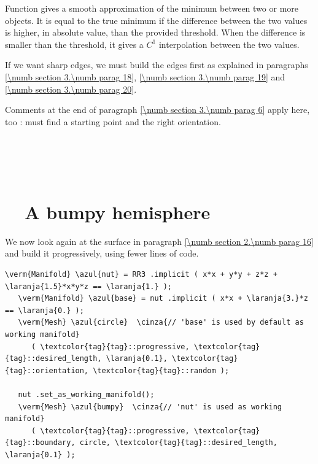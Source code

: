Function {\small\tt{}} gives a smooth approximation of the minimum between
two or more {\small\tt{}} objects.
It is equal to the true minimum if the difference between the two values is higher, in
absolute value, than the provided threshold.
When the difference is smaller than the threshold, it gives a $ C^1 $ interpolation between
the two values.

If we want sharp edges, we must build the edges first as explained in paragraphs
\ref{\numb section 3.\numb parag 18}, \ref{\numb section 3.\numb parag 19} and
\ref{\numb section 3.\numb parag 20}.

Comments at the end of paragraph \ref{\numb section 3.\numb parag 6} apply here, too :
{\maniFEM} must find a starting point and the right orientation.


\section{~~\cinza{[empty]}}\label{\numb section 3.\numb parag 8}


\section{~~A bumpy hemisphere}\label{\numb section 3.\numb parag 9}

We now look again at the surface in paragraph \ref{\numb section 2.\numb parag 16}
and build it progressively, using fewer lines of code.

\begin{Verbatim}[commandchars=\\\{\},formatcom=\small\tt,frame=single,
   label=parag-\ref{\numb section 3.\numb parag 9}.cpp,rulecolor=\color{coment},
   baselinestretch=0.94,framesep=2mm                                            ]
   \verm{Manifold} \azul{nut} = RR3 .implicit ( x*x + y*y + z*z + \laranja{1.5}*x*y*z == \laranja{1.} );
   \verm{Manifold} \azul{base} = nut .implicit ( x*x + \laranja{3.}*z == \laranja{0.} );
   \verm{Mesh} \azul{circle}  \cinza{// 'base' is used by default as working manifold}
      ( \textcolor{tag}{tag}::progressive, \textcolor{tag}{tag}::desired_length, \laranja{0.1}, \textcolor{tag}{tag}::orientation, \textcolor{tag}{tag}::random );
   
   nut .set_as_working_manifold();
   \verm{Mesh} \azul{bumpy}  \cinza{// 'nut' is used as working manifold}
      ( \textcolor{tag}{tag}::progressive, \textcolor{tag}{tag}::boundary, circle, \textcolor{tag}{tag}::desired_length, \laranja{0.1} );
\end{Verbatim}

